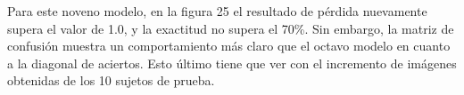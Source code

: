 Para este noveno modelo, en la figura 25 el resultado de pérdida nuevamente supera el valor de 1.0, y la exactitud no supera el 70\%. Sin embargo, la matriz de confusión muestra un comportamiento más claro que el octavo modelo en cuanto a la diagonal de aciertos. Esto último tiene que ver con el incremento de imágenes obtenidas de los 10 sujetos de prueba. 
